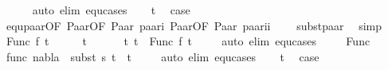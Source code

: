 \begin{isabellebody}
\ \ \ \ \isamarkupfalse%
\ {\isacharparenleft}{\kern0pt}auto\ elim{\isacharcolon}{\kern0pt}\ equ{\isachardot}{\kern0pt}cases{\isacharparenright}{\kern0pt}\isanewline
\ \ \isamarkupfalse%
\ t{}\ \isamarkupfalse%
\ {\isacharquery}{\kern0pt}case\isanewline
\ \ \ \ \isamarkupfalse%
\ equ{\isacharunderscore}{\kern0pt}paar{\isacharbrackleft}{\kern0pt}OF\ Paar{\isacharparenleft}{\kern0pt}{}{\isacharparenright}{\kern0pt}{\isacharbrackleft}{\kern0pt}OF\ Paar{\isacharparenleft}{\kern0pt}{}{\isacharparenright}{\kern0pt}\ paar{\isacharunderscore}{\kern0pt}i{\isacharbrackright}{\kern0pt}\ Paar{\isacharparenleft}{\kern0pt}{}{\isacharparenright}{\kern0pt}{\isacharbrackleft}{\kern0pt}OF\ Paar{\isacharparenleft}{\kern0pt}{}{\isacharparenright}{\kern0pt}\ paar{\isacharunderscore}{\kern0pt}ii{\isacharbrackright}{\kern0pt}{\isacharbrackright}{\kern0pt}\isanewline
\ \ \ \ subst{\isacharunderscore}{\kern0pt}paar\ \isamarkupfalse%
\ simp\isanewline
{}\isamarkupfalse%
\isanewline
\ \ \isamarkupfalse%
\ {\isacharparenleft}{\kern0pt}Func\ f\ t{}{\isacharprime}{\kern0pt}{\isacharparenright}{\kern0pt}\isanewline
\ \ \isamarkupfalse%
\ \isamarkupfalse%
\ t{}{\isacharprime}{\kern0pt}\ \isanewline
\ \ \ \ \ t{}{\isacharcolon}{\kern0pt}\ {\isachardoublequoteopen}t{}\ {\isacharequal}{\kern0pt}\ Func\ f\ t{}{\isacharprime}{\kern0pt}{\isachardoublequoteclose}\isanewline
\ \ \ \ \isamarkupfalse%
{\isacharparenleft}{\kern0pt}auto\ elim{\isacharcolon}{\kern0pt}\ equ{\isachardot}{\kern0pt}cases{\isacharparenright}{\kern0pt}\isanewline
\ \ \ \isamarkupfalse%
\ Func{\isacharparenleft}{\kern0pt}{}{\isacharparenright}{\kern0pt}\ \isanewline
\ \ \ \isamarkupfalse%
\ func{\isacharcolon}{\kern0pt}\ {\isachardoublequoteopen}nabla\ {\isasymturnstile}\ subst\ s{}\ t{}{\isacharprime}{\kern0pt}\ {\isasymapprox}\ t{}{\isacharprime}{\kern0pt}{\isachardoublequoteclose}\isanewline
\ \ \ \isamarkupfalse%
\ {\isacharparenleft}{\kern0pt}auto\ elim{\isacharcolon}{\kern0pt}\ equ{\isachardot}{\kern0pt}cases{\isacharparenright}{\kern0pt}\isanewline
\ \ \isamarkupfalse%
\ t{}\ \isamarkupfalse%
\ {\isacharquery}{\kern0pt}case\isanewline
\ \ \ \ \isamarkupfalse%

\end{isabellebody}

